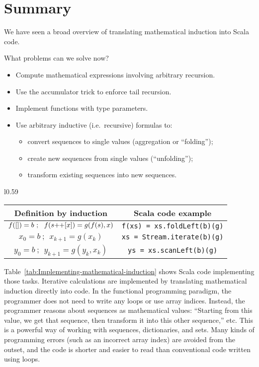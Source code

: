 \section{Summary}

We have seen a broad overview of translating mathematical induction
into Scala code.

What problems can we solve now?
\begin{itemize}
\item Compute mathematical expressions involving arbitrary recursion.
\item Use the accumulator trick to enforce tail recursion.
\item Implement functions with type parameters.
\item Use arbitrary inductive (i.e.\ recursive) formulas to:
\begin{itemize}
\item convert sequences to single values (aggregation or ``folding'');
\item create new sequences from single values (``unfolding'');
\item transform existing sequences into new sequences.
\end{itemize}
\end{itemize}
\begin{wraptable}{l}{0.59\columnwidth}%
\begin{centering}
\vspace{-0.5\baselineskip}
\begin{tabular}{|c|c|}
\hline 
\textbf{\small{}Definition by induction} & \textbf{\small{}Scala code example}\tabularnewline
\hline 
\hline 
{\small{}$f(\left[\right])=b~;~~f(s\negmedspace+\negthickspace+[x])=g(f(s),x)$} & {\small{}}\lstinline!f(xs) = xs.foldLeft(b)(g)!\tabularnewline
\hline 
{\small{}$x_{0}=b~;~~x_{k+1}=g(x_{k})$} & {\small{}}\lstinline!xs = Stream.iterate(b)(g)!\tabularnewline
\hline 
{\small{}$y_{0}=b~;~~y_{k+1}=g(y_{k},x_{k})$} & {\small{}}\lstinline!ys = xs.scanLeft(b)(g)!\tabularnewline
\hline 
\end{tabular}
\par\end{centering}
\caption{Implementing mathematical induction.\label{tab:Implementing-mathematical-induction}}
\vspace{-0.75\baselineskip}
\end{wraptable}%

\noindent Table~\ref{tab:Implementing-mathematical-induction} shows
Scala code implementing those tasks. Iterative calculations are implemented
by translating mathematical induction directly into code. In the functional
programming paradigm, the programmer does not need to write any loops
or use array indices. Instead, the programmer reasons about sequences
as mathematical values: ``Starting from this value, we get that sequence,
then transform it into this other sequence,'' etc. This is a powerful
way of working with sequences, dictionaries, and sets. Many kinds
of programming errors (such as an incorrect array index) are avoided
from the outset, and the code is shorter and easier to read than conventional
code written using loops.

